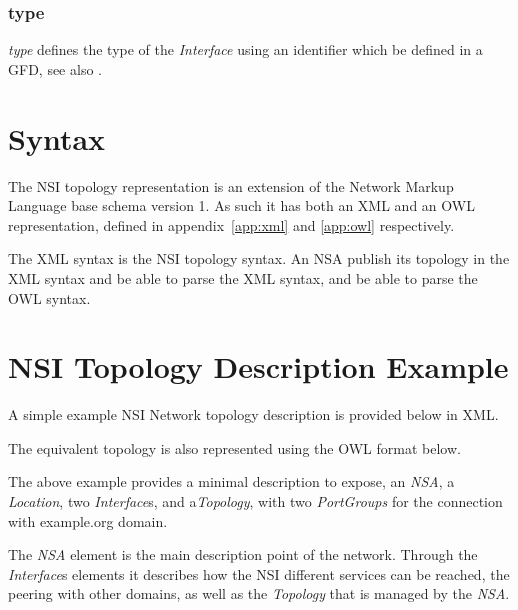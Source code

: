 \documentclass[12pt]{article}  %
\begin{document}

\subsubsection{type} %
\label{ssub:type}

\emph{type} defines the type of the \emph{Interface} using an identifier which \SHOULD{} be defined in a GFD, see also \cite{gfd-discovery-service}.



\section{Syntax} %
\label{sec:syntax}

The NSI topology representation is an extension of the Network Markup Language base schema version 1. As such it has both an XML and an OWL representation, defined in appendix~\ref{app:xml} and \ref{app:owl} respectively.

The XML syntax is the \RECOMMENDED{} NSI topology syntax. An NSA \MUST{} publish its topology in the XML syntax and \MUST{} be able to parse the XML syntax, and \MAY{} be able to parse the OWL syntax.


\section{NSI Topology Description Example}

 A simple example NSI Network topology description is provided 
below in XML.



The equivalent topology is also represented using the OWL format below.






The above example provides a minimal description to expose, 
an \emph{NSA}, a \emph{Location}, two \emph{Interface}s, and a\emph{Topology}, with two \emph{PortGroups} for the connection with example.org domain.

The \emph{NSA} element is the main description point of the network. Through the \emph{Interface}s elements it describes how 
the NSI different services can be reached, the peering with other domains, as well as the \emph{Topology} that is managed by the \emph{NSA}.
\end{document}

